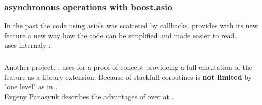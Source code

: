 \subsubsection*{asynchronous operations with boost.asio}

In the past the code using asio's \asyncops was scattered by callbacks.
\boostasio provides with its new feature \asyncres a new way how the code can be
simplified and made easier to read.\\
\yieldcontext uses internaly \boostcoroutine:

\subsubsection*{\csharp \await}

Another project, \awaitemu, uses \boostcoroutine for a proof-of-concept
provideing a full emultation of the \csharp feature \await as a library
extension. Because of stackfull coroutines \await is \textbf{not limited} by
"one level" as in \csharp.\\
Evgeny Panasyuk describes the advantages of \boostcoroutine over \await at
\channelnine.
